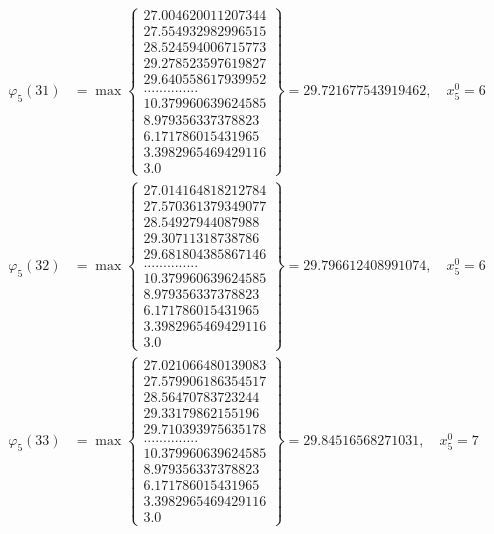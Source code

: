 \documentclass{article}
\begin{document}
\begin{align*}
  
  
  
\varphi_{5}(31) &= \max \left\{ \begin{array}{c}
27.004620011207344 \\
 27.554932982996515 \\
 28.524594006715773 \\
 29.278523597619827 \\
 29.640558617939952 \\
 .............. \\
 10.379960639624585 \\
 8.979356337378823 \\
 6.171786015431965 \\
 3.3982965469429116 \\
 3.0
\end{array} \right\} = 29.721677543919462, \quad x_{5}^0 = 6\\
  
  
  
  
\varphi_{5}(32) &= \max \left\{ \begin{array}{c}
27.014164818212784 \\
 27.570361379349077 \\
 28.54927944087988 \\
 29.30711318738786 \\
 29.681804385867146 \\
 .............. \\
 10.379960639624585 \\
 8.979356337378823 \\
 6.171786015431965 \\
 3.3982965469429116 \\
 3.0
\end{array} \right\} = 29.796612408991074, \quad x_{5}^0 = 6\\
  
  
  
  
\varphi_{5}(33) &= \max \left\{ \begin{array}{c}
27.021066480139083 \\
 27.579906186354517 \\
 28.56470783723244 \\
 29.33179862155196 \\
 29.710393975635178 \\
 .............. \\
 10.379960639624585 \\
 8.979356337378823 \\
 6.171786015431965 \\
 3.3982965469429116 \\
 3.0
\end{array} \right\} = 29.84516568271031, \quad x_{5}^0 = 7\\
  

\end{align*}
\end{document}
